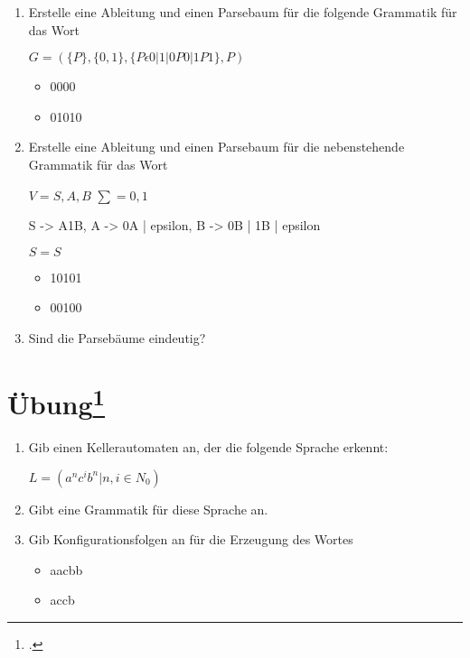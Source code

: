 \documentclass{lehramt-informatik-aufgabe}
\begin{document}
\begin{enumerate}
\item Erstelle eine Ableitung und einen Parsebaum für die folgende
Grammatik für das Wort

$G = ( \{P\} , \{0,1\}, \{P \epsilon  0 | 1 | 0P0 | 1P1\}, P)$

\begin{itemize}
\item 0000
\item 01010
\end{itemize}

\item Erstelle eine Ableitung und einen Parsebaum für die nebenstehende
Grammatik für das Wort

$V = {S, A, B}$
$∑= {0,1}$

\begin{liProduktionsRegeln}
S -> A1B,
A -> 0A | epsilon,
B -> 0B | 1B | epsilon
\end{liProduktionsRegeln}

$S = S$

\begin{itemize}
\item 10101
\item 00100
\end{itemize}

\item Sind die Parsebäume eindeutig?
\end{enumerate}

%

\section{Übung\footcite[Seite 25]{theo:fs:2}}

\begin{enumerate}
\item Gib einen Kellerautomaten an, der die folgende Sprache erkennt:

$L = (a^n c^i b^n | n, i \in N_0)$

\item Gibt eine Grammatik für diese Sprache an.

\item Gib Konfigurationsfolgen an für die Erzeugung des Wortes

\begin{itemize}
\item aacbb
\item accb
\end{itemize}

\end{enumerate}
\end{document}
